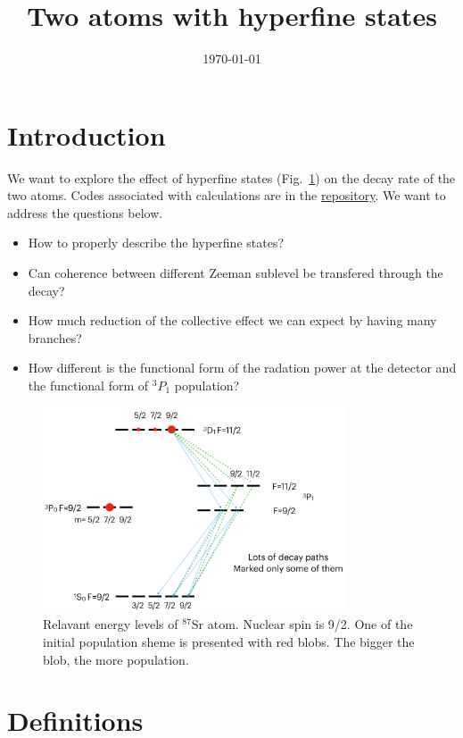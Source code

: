 \documentclass{article}
\title{Two atoms with hyperfine states}
\date{\today}
\begin{document}
\maketitle

\section{Introduction}
We want to explore the effect of hyperfine states (Fig.~\ref{fig:level_diagram}) on the decay rate of the two atoms. Codes associated with calculations are in the \href{https://github.com/kimkyngt/DecayDynamics}{repository}. We want to address the questions below.
\begin{itemize}
    \item How to properly describe the hyperfine states?
    \item Can coherence between different Zeeman sublevel be transfered through the decay?
    \item How much reduction of the collective effect we can expect by having many branches?
    \item How different is the functional form of the radation power at the detector and the functional form of $^3P_1$ population?
\end{itemize}

\begin{figure}[h]
    \centering
    \includegraphics[width=0.8\textwidth]{level_diagram.pdf}
    \caption{Relavant energy levels of $^{87}$Sr atom. Nuclear spin is 9/2. One of the initial population sheme is presented with red blobs. The bigger the blob, the more population.  \label{fig:level_diagram}}
\end{figure}
\section{Definitions}
\end{document}
